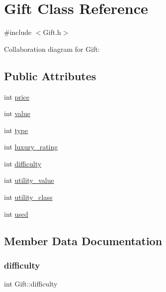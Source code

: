 \hypertarget{class_gift}{}\section{Gift Class Reference}
\label{class_gift}


{\ttfamily \#include $<$Gift.\+h$>$}



Collaboration diagram for Gift\+:
\subsection*{Public Attributes}
\begin{DoxyCompactItemize}
\item 
int \hyperlink{class_gift_ad795362f286e8d5d73514fb64ac478b8}{price}
\item 
int \hyperlink{class_gift_a71d14b92ebfd06993afe584f088bc748}{value}
\item 
int \hyperlink{class_gift_a63fb63fdc6f0821417039da90a54ad4c}{type}
\item 
int \hyperlink{class_gift_a8dad74474083de19fa0eed4b2b6e8e60}{luxury\+\_\+rating}
\item 
int \hyperlink{class_gift_ae2d1aee64a09bae5e46914c8bf518690}{difficulty}
\item 
int \hyperlink{class_gift_abb39e839cc029d8a50df87541e9c6763}{utility\+\_\+value}
\item 
int \hyperlink{class_gift_a0ceaac7117c8f4abcaac4cd7e89547e9}{utility\+\_\+class}
\item 
int \hyperlink{class_gift_a060bb74b499ea64b7448f6395c5151be}{used}
\end{DoxyCompactItemize}


\subsection{Member Data Documentation}
\mbox{\label{class_gift_ae2d1aee64a09bae5e46914c8bf518690}} 
\subsubsection{\texorpdfstring{difficulty}{difficulty}}
{\footnotesize\ttfamily int Gift\+::difficulty}

\mbox{\label{class_gift_a8dad74474083de19fa0eed4b2b6e8e60}} 
